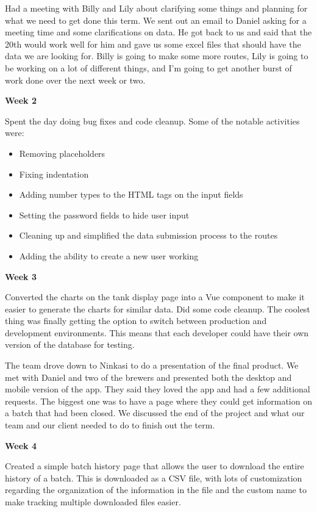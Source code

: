 Had a meeting with Billy and Lily about clarifying some things and planning for what we need to get done this term.
We sent out an email to Daniel asking for a meeting time and some clarifications on data.
He got back to us and said that the 20th would work well for him and gave us some excel files that should have the data we are looking for.
Billy is going to make some more routes, Lily is going to be working on a lot of different things, and I’m going to get another burst of work done over the next week or two.


\noindent\medskip\textbf{Week 2}

Spent the day doing bug fixes and code cleanup.
Some of the notable activities were:

\begin{itemize}
  \item Removing placeholders
  \item Fixing indentation
  \item Adding number types to the HTML tags on the input fields
  \item Setting the password fields to hide user input
  \item Cleaning up and simplified the data submission process to the routes
  \item Adding the ability to create a new user working
\end{itemize}

\noindent\medskip\textbf{Week 3}

Converted the charts on the tank display page into a Vue component to make it easier to generate the charts for similar data.
Did some code cleanup.
The coolest thing was finally getting the option to switch between production and development environments.
This means that each developer could have their own version of the database for testing.

The team drove down to Ninkasi to do a presentation of the final product.
We met with Daniel and two of the brewers and presented both the desktop and mobile version of the app.
They said they loved the app and had a few additional requests.
The biggest one was to have a page where they could get information on a batch that had been closed.
We discussed the end of the project and what our team and our client needed to do to finish out the term.

\noindent\medskip\textbf{Week 4}

Created a simple batch history page that allows the user to download the entire history of a batch.
This is downloaded as a CSV file, with lots of customization regarding the organization of the information in the file and the custom name to make tracking multiple downloaded files easier.

